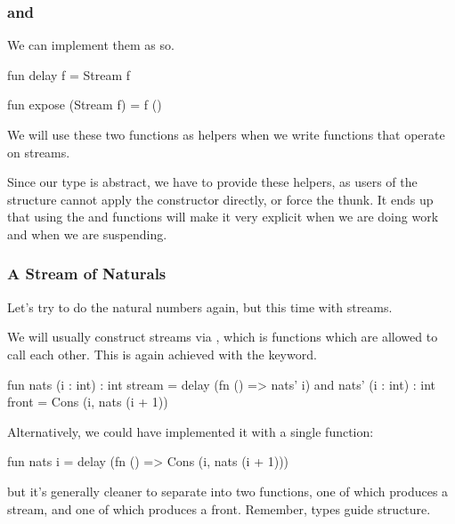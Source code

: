 \documentclass[aspectratio=169]{beamer}
\begin{document}
\begin{frame}[fragile]
  \frametitle{ and }

  We can implement them as so.

  \pause
  \vspace{\fill}

  \begin{codeblock}
    fun delay f = Stream f
  \end{codeblock}

  \vspace{\fill}

  \begin{codeblock}
    fun expose (Stream f) = f ()
  \end{codeblock}

  \pause
  \vspace{\fill}

  We will use these two functions as helpers when we write functions that operate
  on streams.

  \pause
  \vspace{\fill}

  Since our  type is abstract, we have to provide these helpers, as
  users of the structure cannot apply the  constructor directly, or
  force the thunk. It ends up that using the  and  functions
  will make it very explicit when we are doing work and when we are suspending.
\end{frame}

\begin{frame}[fragile]
  \frametitle{A Stream of Naturals}

  Let's try to do the natural numbers again, but this time with streams.

  \pause
  \vspace{\fill}

  We will usually construct streams via , which is
  functions which are allowed to call each other. This is again achieved
  with the  keyword.

  \pause
  \vspace{\fill}

  \begin{codeblock}
    fun nats  (i : int) : int stream = delay (fn () => nats' i)
    and nats' (i : int) : int front  = Cons (i, nats (i + 1))
  \end{codeblock}

  \pause
  \vspace{\fill}

  Alternatively, we could have implemented it with a single function:
  \begin{codeblock}
    fun nats i = delay (fn () => Cons (i, nats (i + 1)))
  \end{codeblock}
  but it's generally cleaner to separate into two functions, one of which
  produces a stream, and one of which produces a front. Remember, types
  guide structure.
\end{frame}
\end{document}
